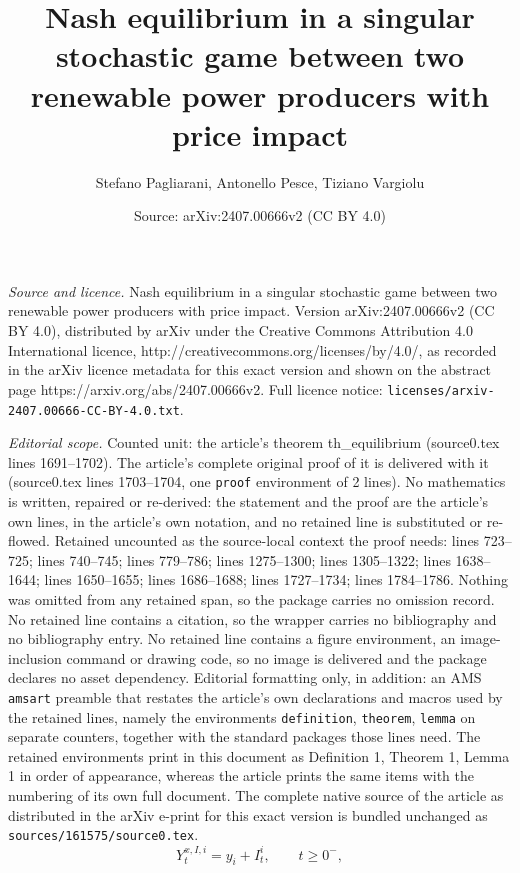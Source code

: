 \documentclass[10pt,a4paper]{amsart}
\title{Nash equilibrium in a singular stochastic game between two renewable power producers with price impact}
\author{Stefano Pagliarani, Antonello Pesce, Tiziano Vargiolu}
\date{Source: arXiv:2407.00666v2 (CC BY 4.0)}
\begin{document}
\maketitle

\noindent\emph{Source and licence.} Nash equilibrium in a singular stochastic game between two renewable power producers with price impact. Version arXiv:2407.00666v2 (CC BY 4.0), distributed by arXiv under the Creative Commons Attribution 4.0 International licence, http://creativecommons.org/licenses/by/4.0/, as recorded in the arXiv licence metadata for this exact version and shown on the abstract page https://arxiv.org/abs/2407.00666v2. Full licence notice: \texttt{licenses/arxiv-2407.00666-CC-BY-4.0.txt}.\par\smallskip

\noindent\textit{Editorial scope.} Counted unit: the article's theorem th\_equilibrium (source0.tex lines 1691--1702). The article's complete original proof of it is delivered with it (source0.tex lines 1703--1704, one \texttt{proof} environment of 2 lines). No mathematics is written, repaired or re-derived: the statement and the proof are the article's own lines, in the article's own notation, and no retained line is substituted or re-flowed.  Retained uncounted as the source-local context the proof needs: lines 723--725; lines 740--745; lines 779--786; lines 1275--1300; lines 1305--1322; lines 1638--1644; lines 1650--1655; lines 1686--1688; lines 1727--1734; lines 1784--1786.  Nothing was omitted from any retained span, so the package carries no omission record.  No retained line contains a citation, so the wrapper carries no bibliography and no bibliography entry.  No retained line contains a figure environment, an image-inclusion command or drawing code, so no image is delivered and the package declares no asset dependency.  Editorial formatting only, in addition: an AMS \texttt{amsart} preamble that restates the article's own declarations and macros used by the retained lines, namely the environments \texttt{definition}, \texttt{theorem}, \texttt{lemma} on separate counters, together with the standard packages those lines need.  The retained environments print in this document as Definition 1, Theorem 1, Lemma 1 in order of appearance, whereas the article prints the same items with the numbering of its own full document.  The complete native source of the article as distributed in the arXiv e-print for this exact version is bundled unchanged as \texttt{sources/161575/source0.tex}.
\begin{equation}\label{installed_power}
Y^{x,I,i}_t=y_i+I^i_t, \qquad t\ge 0^-,
\end{equation}
\end{document}
